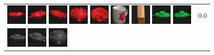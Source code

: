 \begin{figure}[tbp]
\begin{center}
\begin{tabular}{m{11cm} | m{3cm} |}
\includegraphics[width=1cm]{coil/beeld-19.eps}
\includegraphics[width=1cm]{coil/beeld-21.eps}
\includegraphics[width=1cm]{coil/beeld-22.eps}
\includegraphics[width=1cm]{coil/beeld-20.eps}
\includegraphics[width=1cm]{coil/beeld-23.eps}
\includegraphics[width=1cm]{coil/beeld-39.eps}
\includegraphics[width=1cm]{coil/beeld-44.eps}
\includegraphics[width=1cm]{coil/beeld-54.eps}
\includegraphics[width=1cm]{coil/beeld-55.eps}
& {\scriptsize 0.0}
\\
\includegraphics[width=1cm]{coil/beeld-24.eps}
\includegraphics[width=1cm]{coil/beeld-25.eps}
\includegraphics[width=1cm]{coil/beeld-28.eps}

\end{tabular}
\end{center}
\end{figure}
